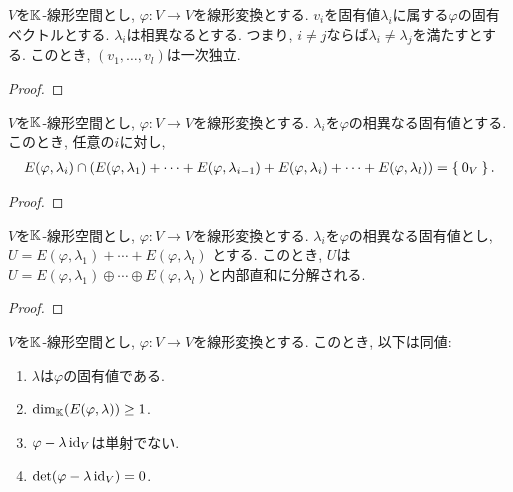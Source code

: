 \begin{prop}
  $V$を$\mathbb{K}$-線形空間とし,
  $\varphi\colon V\to V$を線形変換とする.
  $v_i$を固有値$\lambda_i$に属する$\varphi$の固有ベクトルとする.
  $\lambda_i$は相異なるとする.
  つまり, $i\neq j$ならば$\lambda_i \neq \lambda_j$を満たすとする.
  このとき,
  $(v_1,\ldots, v_l)$は一次独立.
\end{prop}
\begin{proof}\end{proof}

\begin{cor}
  $V$を$\mathbb{K}$-線形空間とし,
  $\varphi\colon V\to V$を線形変換とする.
  $\lambda_i$を$\varphi$の相異なる固有値とする.
  このとき, 任意の$i$に対し,
  \begin{align*}
    E(\varphi,\lambda_i)\cap(E(\varphi,\lambda_1)+\cdots +E(\varphi,\lambda_{i-1})+E(\varphi,\lambda_i)+\cdots +E(\varphi,\lambda_{l}))=\Set{0_V}.
  \end{align*}
\end{cor}
\begin{proof}\end{proof}

\begin{cor}
  $V$を$\mathbb{K}$-線形空間とし,
  $\varphi\colon V\to V$を線形変換とする.
  $\lambda_i$を$\varphi$の相異なる固有値とし,
  $U=E(\varphi,\lambda_1)+\cdots +E(\varphi,\lambda_{l})$
  とする.
  このとき, $U$は$U=E(\varphi,\lambda_1)\oplus \cdots \oplus E(\varphi,\lambda_{l})$と内部直和に分解される.
\end{cor}
\begin{proof}\end{proof}

\begin{prop}
  $V$を$\mathbb{K}$-線形空間とし,
  $\varphi\colon V\to V$を線形変換とする.
  このとき, 以下は同値:
  \begin{enumerate}
  \item $\lambda$は$\varphi$の固有値である.
  \item $\dim_{\mathbb{K}}(E(\varphi,\lambda))\geq 1$.
  \item $\varphi-\lambda\operatorname{id}_V$は単射でない.
  \item $\det(\varphi-\lambda\operatorname{id}_V)=0$.    
  \end{enumerate}
\end{prop}

